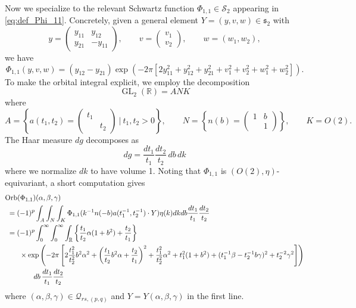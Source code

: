 \documentclass[reqno, 11pt]{amsart} %
\numberwithin{equation}{section}
\theoremstyle{plain}
\theoremstyle{definition}
\theoremstyle{remark}
\newcommand{\calQ}{\mathcal Q}
\newcommand{\lie}[1]{ \mathfrak{#1}}
\DeclareMathOperator{\GL}{GL}
\newcommand{\Orb}{\mathrm{Orb}}
\begin{document}
Now we specialize to the relevant Schwartz function $\Phi_{1,1} \in \mathcal S_2$
appearing in \eqref{eq:def_Phi_11}. Concretely, given a general element $ Y = (y,v,w) \in \lie{s_2}$ with
\[
y = \begin{pmatrix} y_{11} & y_{12} \\ y_{21} & - y_{11} \end{pmatrix}, \qquad v = \begin{pmatrix} v_1 \\ v_2 \end{pmatrix} , \qquad w = ( w_1, w_2),
\]
we have
\[
\Phi_{1,1}(y,v,w) =   (y_{12}- y_{21})\exp \left( - 2 \pi \left[ 2 y_{11}^2 + y_{12}^2 + y_{21}^2 + v_1^2 + v_2^2 + w_1^2 + w_2^2  \right] \right).
\]
To make the orbital integral explicit, we employ the decomposition
\[
\GL_2(\mathbb R) = A N K
\]
where
\[
A = \left\{ a(t_1, t_2) = \begin{pmatrix} t_1 & \\ & t_2 \end{pmatrix} \  | \ t_1, t_2 > 0 \right\}, \qquad N = \left\{ n(b) = \begin{pmatrix} 1 & b \\ & 1 \end{pmatrix} \right\}, \qquad K = O(2).
\]
The Haar measure $dg$ decomposes as
\[
dg = \frac{dt_1}{t_1} \frac{dt_2}{t_2} \, db \, dk
\]
where we normalize $dk$ to have volume 1. Noting that $\Phi_{1,1}$ is $(O(2), \eta)$-equivariant, a short computation gives
\begin{align}
&\Orb(\Phi_{1,1}) (\alpha,\beta,\gamma)  \notag\\
& \ =   (-1)^p \int_A \int_N \int_K \Phi_{1,1}( k^{-1}n(-b) a(t_1^{-1}, t_2^{-1} )\cdot Y) \eta(k)  dk db \frac{dt_1}{t_1} \frac{dt_2}{t_2} \notag  \\
& \ = (-1)^p \int_{0}^{\infty} \int_{ 0}^{\infty} \int_{ \mathbb R} \left\{  \frac{t_1}{t_2}\alpha (1+b^2) + \frac{t_2}{t_1} \right\} \notag \\
&\qquad  	\times \exp\left( - 2\pi \left[  2 \frac{t_1^2}{t_2^2} b^2 \alpha^2 + \left( \frac{t_1}{t_2} b^2 \alpha + \frac{t_2}{t_1} \right)^2  + \frac{t_1^2}{t_2^2}\alpha^2 + t_1^2(1+b^2) + (t_1^{-1} \beta - t_2^{-1} b \gamma)^2 + t_2^{-2} \gamma^2 \right] \right) \notag  \\
& \qquad \qquad db \, \frac{dt_1}{t_1} \frac{dt_2}{t_2} \label{eqn:Phi11 explicit general}
\end{align}
where $(\alpha,\beta,\gamma) \in \calQ_{rs, (p,q)}$ and $Y = Y(\alpha,\beta,\gamma)$ in the first line.
\end{document}
